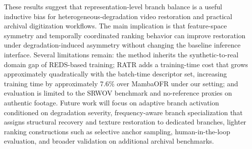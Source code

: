 These results suggest that representation-level branch balance is a useful inductive bias for heterogeneous-degradation video restoration and practical archival digitization workflows. The main implication is that feature-space symmetry and temporally coordinated ranking behavior can improve restoration under degradation-induced asymmetry without changing the baseline inference interface. Several limitations remain: the method inherits the synthetic-to-real domain gap of REDS-based training; RATR adds a training-time cost that grows approximately quadratically with the batch-time descriptor set, increasing training time by approximately 7.6\% over MambaOFR under our setting; and evaluation is limited to the SRWOV benchmark and no-reference proxies on authentic footage. Future work will focus on adaptive branch activation conditioned on degradation severity, frequency-aware branch specialization that assigns structural recovery and texture restoration to dedicated branches, lighter ranking constructions such as selective anchor sampling, human-in-the-loop evaluation, and broader validation on additional archival benchmarks.
